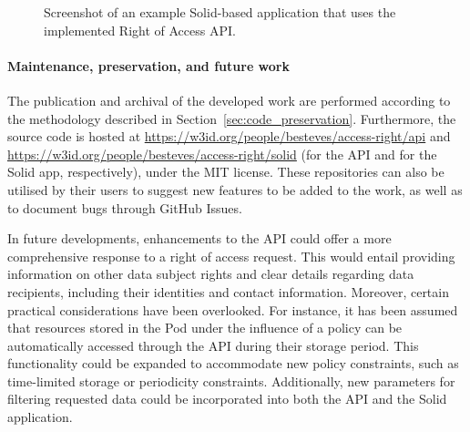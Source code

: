 \begin{figure}[ht]
    \centering
    \caption[Screenshot of an application that uses the Right of Access API.]{Screenshot of an example Solid-based application that uses the implemented Right of Access API.}
    \label{fig:right-app}
\end{figure}

\paragraph{Maintenance, preservation, and future work}
The publication and archival of the developed work are performed according to the methodology described in Section~\ref{sec:code_preservation}.
Furthermore, the source code is hosted at \url{https://w3id.org/people/besteves/access-right/api} and \url{https://w3id.org/people/besteves/access-right/solid} (for the API and for the Solid app, respectively), under the MIT license.
These repositories can also be utilised by their users to suggest new features to be added to the work, as well as to document bugs through GitHub Issues.

In future developments, enhancements to the API could offer a more comprehensive response to a right of access request.
This would entail providing information on other data subject rights and clear details regarding data recipients, including their identities and contact information.
Moreover, certain practical considerations have been overlooked.
For instance, it has been assumed that resources stored in the Pod under the influence of a policy can be automatically accessed through the API during their storage period.
This functionality could be expanded to accommodate new policy constraints, such as time-limited storage or periodicity constraints. 
Additionally, new parameters for filtering requested data could be incorporated into both the API and the Solid application.

